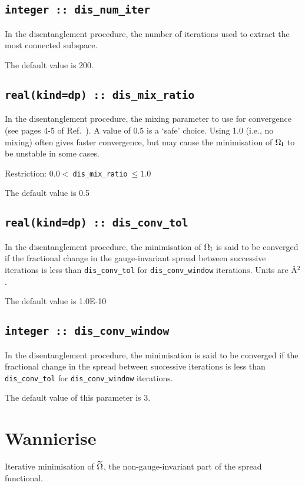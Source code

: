 \subsection[dis\_num\_iter]{\tt integer :: dis\_num\_iter}
In the disentanglement procedure, the
number of iterations used to extract the most connected subspace.

The default value is 200.

\subsection[dis\_mix\_ratio]{\tt real(kind=dp) :: dis\_mix\_ratio}
In the disentanglement procedure, the mixing parameter to use for
convergence (see pages 4-5 of Ref.~\cite{SMV}). A value of 0.5 is a `safe'
choice. Using 1.0 (i.e., no mixing) often gives faster convergence, 
but may cause the minimisation of $\Omega_{\mathrm{I}}$ to be unstable in some cases.

Restriction: $0.0<\:${\tt dis\_mix\_ratio}$\:\leq 1.0$

The default value is 0.5 

\subsection[dis\_conv\_tol]{\tt real(kind=dp) :: dis\_conv\_tol}

In the disentanglement procedure, the minimisation of $\Omega_{\mathrm{I}}$ is said
to be converged if the fractional change in the gauge-invariant spread
between successive iterations is less than
\verb#dis_conv_tol# for \verb#dis_conv_window# iterations. Units are \AA$^2$.

The default value is 1.0E-10


\subsection[dis\_conv\_window]{\tt integer :: dis\_conv\_window}

In the disentanglement procedure, the minimisation is said to be converged
if the fractional change in the spread between successive
iterations is less than
\verb#dis_conv_tol# for \verb#dis_conv_window# iterations.

The default value of this parameter is 3.



\section{Wannierise}\label{sec:wann_params}
Iterative minimisation of $\widetilde{\Omega}$, the non-gauge-invariant part of the
spread functional.

